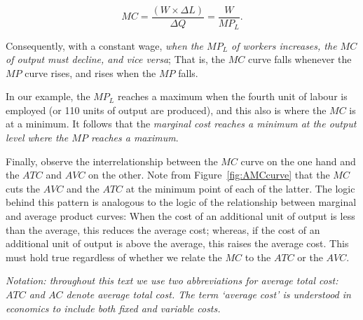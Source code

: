 \begin{equation*}
MC=\frac{(W\times\Delta L)}{\Delta Q}=\frac{W}{MP_L}.
\end{equation*}

Consequently, with a constant wage, \textit{when the $MP_L$ of workers increases, the $MC$ of output must decline, and vice versa}; That is, the $MC$ curve falls whenever the $MP$ curve rises, and rises when the $MP$ falls.

In our example, the $MP_L$ reaches a maximum when the fourth unit of labour is employed (or 110 units of output are produced), and this also is where the $MC$ is at a minimum. It follows that the \textit{marginal cost reaches a minimum at the output level where the $MP$ reaches a maximum}.

Finally, observe the interrelationship between the $MC$ curve on the one hand and the $ATC$ and $AVC$ on the other. Note from Figure~\ref{fig:AMCcurve} that the $MC$ cuts the $AVC$ and the $ATC$ at the minimum point of each of the latter. The logic behind this pattern is analogous to the logic of the relationship between marginal and average product curves: When the cost of an additional unit of output is less than the average, this reduces the average cost; whereas, if the cost of an additional unit of output is above the average, this raises the average cost. This must hold true regardless of whether we relate the $MC$ to the $ATC$ or the $AVC$.

\textit{Notation: throughout this text we use two abbreviations for average total cost: $ATC$ and $AC$ denote average total cost. The term `average cost' is understood in economics to include both fixed and variable costs.}